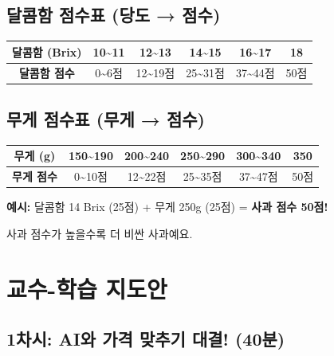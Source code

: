 \documentclass[12pt,a4paper]{article}
\begin{document}
\subsection{ 달콤함 점수표 (당도 → 점수)}

\begin{center}
\begin{tabular}{|c|c|c|c|c|c|}
\hline
\textbf{달콤함 (Brix)} & 10\textasciitilde11 & 12\textasciitilde13 & 14\textasciitilde15 & 16\textasciitilde17 & 18 \\
\hline
\textbf{달콤함 점수} & 0\textasciitilde6점 & 12\textasciitilde19점 & 25\textasciitilde31점 & 37\textasciitilde44점 & 50점 \\
\hline
\end{tabular}
\end{center}

\subsection{ 무게 점수표 (무게 → 점수)}

\begin{center}
\begin{tabular}{|c|c|c|c|c|c|}
\hline
\textbf{무게 (g)} & 150\textasciitilde190 & 200\textasciitilde240 & 250\textasciitilde290 & 300\textasciitilde340 & 350 \\
\hline
\textbf{무게 점수} & 0\textasciitilde10점 & 12\textasciitilde22점 & 25\textasciitilde35점 & 37\textasciitilde47점 & 50점 \\
\hline
\end{tabular}
\end{center}

\begin{tcolorbox}[colback=lightgreen,colframe=applegreen,title=\textbf{\texttwemoji{star} 사과 점수 = 달콤함 점수 + 무게 점수}]
\textbf{예시:} 달콤함 14 Brix (25점) + 무게 250g (25점) = \textbf{사과 점수 50점!}

\vspace{0.2cm}
사과 점수가 높을수록 더 비싼 사과예요.
\end{tcolorbox}

\section{교수-학습 지도안}

\subsection{1차시: AI와 가격 맞추기 대결! (40분)}
\end{document}
